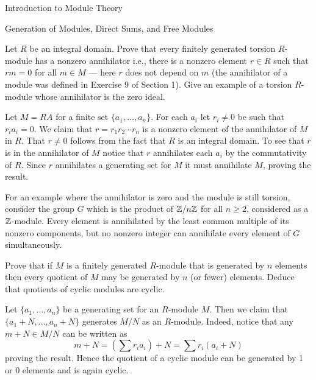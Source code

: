 \begin{chapter}{Introduction to Module Theory}
\begin{section}{Generation of Modules, Direct Sums, and Free Modules}
\begin{problem}\label{ex:10.3.5}
Let $R$ be an integral domain. Prove that every finitely generated torsion $R$-module has a nonzero annihilator i.e., there is a nonzero element $r\in R$ such that $rm=0$ for all $m\in M$ --- here $r$ does not depend on $m$ (the annihilator of a module was defined in Exercise 9 of Section 1). Give an example of a torsion $R$-module whose annihilator is the zero ideal. 
\end{problem}
\begin{solution}
Let $M = RA$ for a finite set $\{a_1,\ldots, a_n\}$. For each $a_i$ let $r_i\neq 0$ be such that $r_ia_i = 0$. We claim that $r = r_1r_2\cdots r_n$ is a nonzero element of the annihilator of $M$ in $R$. That $r\neq 0$ follows from the fact that $R$ is an integral domain. To see that $r$ is in the annihilator of $M$ notice that $r$ annihilates each $a_i$ by the commutativity of $R$. Since $r$ annihilates a generating set for $M$ it must annihilate $M$, proving the result.

For an example where the annihilator is zero and the module is still torsion, consider the group $G$ which is the product of $\mathbb{Z}/n\mathbb{Z}$ for all $n\ge 2$, considered as a $\mathbb{Z}$-module. Every element is annihilated by the least common multiple of its nonzero components, but no nonzero integer can annihilate every element of $G$ simultaneously.
\end{solution}\oneperpage



\begin{problem}\label{ex:10.3.6}
Prove that if $M$ is a finitely generated $R$-module that is generated by $n$ elements then every quotient of $M$ may be generated by $n$ (or fewer) elements. Deduce that quotients of cyclic modules are cyclic. 
\end{problem}
\begin{solution}Let $\{a_1,\ldots, a_n\}$ be a generating set for an $R$-module $M$. Then we claim that $\{a_1+N, \ldots, a_n+N\}$ generates $M/N$ as an $R$-module. Indeed, notice that any $m+N\in M/N$ can be written as \[
m+N = \left(\sum r_i a_i\right) +N  = \sum r_i(a_i+N)
\]
proving the result. Hence the quotient of a cyclic module can be generated by 1 or 0 elements and is again cyclic. 

\end{solution}\oneperpage




\end{section}
\end{chapter}
